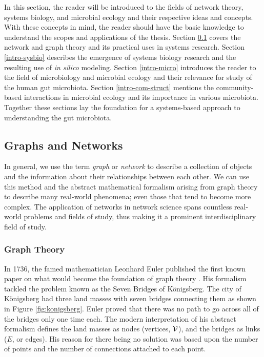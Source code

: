 In this section, the reader will be introduced to the fields of network theory,  systems biology,  and microbial ecology and their respective ideas and concepts. With these concepts in mind, the reader should have the basic knowledge to understand the scopes and applications of the thesis. Section \ref{intro-network} covers the network and graph theory and its practical uses in systems research. Section \ref{intro-sysbio} describes the emergence of systems biology research and the resulting use of \textit{in silico} modeling. Section \ref{intro-micro} introduces the reader to the field of microbiology and microbial ecology and their relevance for study of the human gut microbiota. Section \ref{intro-com-struct} mentions the community-based interactions in microbial ecology and its importance in various microbiota. Together these sections lay the foundation for a systems-based approach to understanding the gut microbiota.%




\subsection{Graphs and Networks} \label{intro-network}
 In general, we use the term \textit{graph} or \textit{network} to describe a collection of objects and the information about their relationships between each other. We can use this method and the abstract mathematical formalism arising from graph theory to describe many real-world phenomena; even those that tend to become more complex. The application of networks in network science spans countless real-world problems and fields of study, thus making it a prominent interdisciplinary field of study. 
 

\subsubsection{Graph Theory} \label{intro-net-graph}

In 1736, the famed mathematician Leonhard Euler published the first known paper on what would become the foundation of graph theory \citep{Euler1736}. His formalism tackled the problem known as the Seven Bridges of Königsberg. The city of Königsberg had three land masses with seven bridges connecting them as shown in Figure \ref{fig:konigsberg}. Euler proved that there was no path to go across all of the bridges only one time each. The modern interpretation of his abstract formalism defines the land masses as nodes (vertices, $\mathcal{V}$), and the bridges as links ($E$, or edges). His reason for there being no solution was based upon the number of points and the number of connections attached to each point. 

